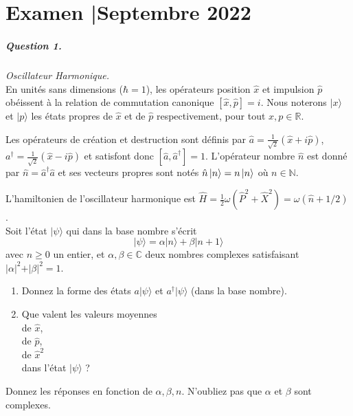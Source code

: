 
\chapter*{Examen \hsp\textcolor{gray75}{|}\hsp Septembre 2022}

\paragraph{Question 1.} \textit{Oscillateur Harmonique.} \\

En unités sans dimensions ($\hbar=1$), les opérateurs position $\hat x$ et impulsion $\hat p$ obéissent à la relation de commutation canonique $[\hat x, \hat p]=i $.  Nous noterons $\lvert x \rangle$ et $\lvert p \rangle$ les états propres de $\hat x$ et de $\hat p $ respectivement, pour tout $x, p \in \mathbb{R}$.

Les opérateurs de création et destruction sont définis par 
$\hat a= \frac{1}{\sqrt{2}}(\hat x+i\hat p)$, $a^\dagger= \frac{1}{\sqrt{2}}(\hat x-i\hat p)$ et satisfont donc $[\hat a,\hat a^\dagger]=1$. L'opérateur nombre $\hat n$ est donné par $\hat n= \hat a^\dagger \hat a$ et ses vecteurs propres sont notés $\hat n \ket{n} =n \ket{n}$ où $n \in \mathbb{N}$. 

L'hamiltonien de l'oscillateur harmonique est $\hat H = \frac{1}{2}\omega ( \hat P^2 + \hat X^2 ) = \omega (\hat n + 1/2)\ $. \\

Soit l'état $\vert \psi \rangle$ qui dans la base nombre s'écrit
\begin{equation}
\vert \psi \rangle = \alpha \vert n \rangle + \beta \vert n+1 \rangle 
\end{equation}
avec $n\geq 0$ un entier, et $\alpha,\beta \in \mathbb{C}$ deux nombres complexes satisfaisant $\vert \alpha \vert^2 + \vert \beta \vert^2=1$.

\begin{enumerate}
\item 
Donnez la forme des états $a \vert \psi \rangle$ et $a^\dagger \vert \psi \rangle$ (dans la base nombre).
\item
Que valent les valeurs moyennes\\
de $\hat x$, \\
de $\hat p$, \\
de $\hat x^2$\\
dans l'état $\vert \psi \rangle$ ?

\end{enumerate}
Donnez les réponses 
en fonction de $\alpha, \beta, n$. N'oubliez pas que $\alpha$ et $\beta$ sont complexes.


